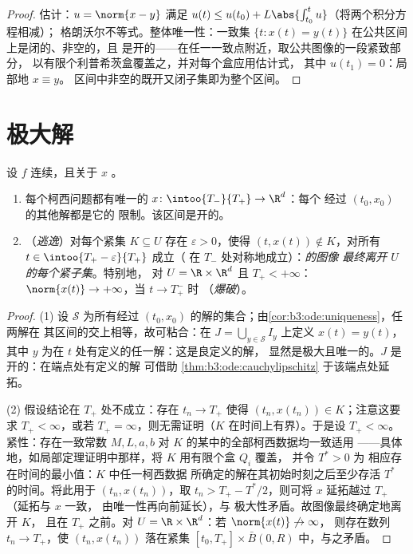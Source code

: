 \begin{proof}
估计：$u = \norm{x - y}$ 满足 $u(t) \leq u(t_0)
+ L\abs{\int_{t_0}^tu}$（将两个积分方程相减）；
格朗沃尔不等式。整体唯一性：一致集 $\{t : x(t)
= y(t)\}$ 在公共区间上是闭的、非空的，且
是开的——在任一一致点附近，取公共图像的一段紧致部分，
以有限个利普希茨盒覆盖之，并对每个盒应用估计式，
其中 $u(t_1) = 0$：局部地 $x \equiv y$。
区间中非空的既开又闭子集即为整个区间。
\end{proof}

\section{极大解}

\begin{theorem}
\label{thm:b3:ode:maximal}
设 $f$ 连续，且关于 $x$ 。
\begin{enumerate}
  \item 每个柯西问题都有唯一的\emph{}
        $x \colon \intoo{T_-}{T_+} \to \R^d$：每个
        经过 $(t_0, x_0)$ 的其他解都是它的
        限制。该区间是开的。
  \item （\emph{逃逸}）对每个紧集 $K \subseteq U$
        存在 $\varepsilon > 0$，使得 $(t, x(t)) \notin
        K$，对所有 $t \in \intoo{T_+ - \varepsilon}{T_+}$ 成立（
        在 $T_-$ 处对称地成立）：\emph{的图像
        最终离开
        $U$ 的每个紧子集}。特别地，
        对 $U = \R\times\R^d$ 且 $T_+ < +\infty$：
        $\norm{x(t)} \to +\infty$，当 $t \to T_+^-$ 时
        （\emph{爆破}）。
\end{enumerate}
\end{theorem}

\begin{proof}
(1) 设 $\mathcal S$ 为所有经过
$(t_0, x_0)$ 的解的集合；由\cref{cor:b3:ode:uniqueness}，任两解在
其区间的交上相等，故可粘合：在 $J =
\bigcup_{y \in \mathcal S}I_y$ 上定义 $x(t) = y(t)$，其中
$y$ 为在 $t$ 处有定义的任一解：这是良定义的解，
显然是极大且唯一的。$J$ 是开的：在端点处有定义的解
可借助
\cref{thm:b3:ode:cauchylipschitz} 于该端点处延拓。

(2) 假设结论在 $T_+$ 处不成立：存在 $t_n \to
T_+$ 使得 $(t_n, x(t_n)) \in K$；注意这要求 $T_+ <
\infty$，或若 $T_+ = \infty$，则无需证明（$K$
在时间上有界）。于是设 $T_+ < \infty$。紧性：存在一致常数 $M, L, a,
b$ 对 $K$ 的某中的全部柯西数据均一致适用
——具体地，如局部定理证明中那样，将 $K$ 用有限个盒 $Q_i$ 覆盖，
并令 $T^* > 0$ 为
相应存在时间的最小值：$K$ 中任一柯西数据
所确定的解在其初始时刻之后至少存活 $T^*$
的时间。将此用于 $(t_n, x(t_n))$，取 $t_n > T_+ -
T^*/2$，则可将 $x$ 延拓越过 $T_+$（延拓与 $x$ 一致，
由唯一性再向前延长），与
极大性矛盾。故图像最终确定地离开 $K$，
且在 $T_+$ 之前。对 $U = \R\times\R^d$：若 $\norm{x(t)}\not\to\infty$，
则存在数列 $t_n \to T_+$，使 $(t_n, x(t_n))$ 落在紧集
$[t_0, T_+]\times\bar B(0, R)$ 中，与之矛盾。
\end{proof}


